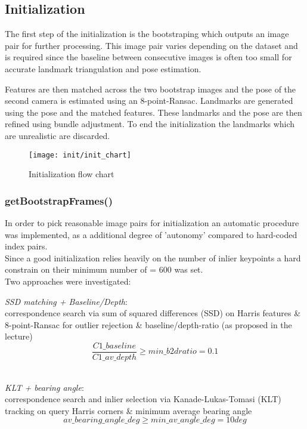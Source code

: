 \subsection{Initialization}
\label{sec_init}
The first step of the initialization is the bootstraping which outputs an image pair for further processing. This image pair varies depending on the dataset and is required since the baseline between consecutive images is often too small for accurate landmark triangulation and pose estimation.

Features are then matched across the two bootstrap images and the pose of the second camera is estimated using an 8-point-Ransac.
Landmarks are generated using the pose and the matched features. These landmarks and the pose are then refined using bundle adjustment. To end the initialization the landmarks which are unrealistic are discarded.

\begin{figure}[ht]
	\centering
	\texttt{[image: init/init\_chart]}
	\caption{Initialization flow chart}
	\label{img_flow_init}
\end{figure}

\subsubsection{getBootstrapFrames()}
\label{sec_boot}
In order to pick reasonable image pairs for initialization an automatic procedure was implemented, as a additional degree of 'autonomy' compared to hard-coded index pairs.\\
Since a good initialization relies heavily on the number of inlier keypoints a hard constrain on their minimum number of  = $600$ was set.\\

Two approaches were investigated:
\begin{compactitem}
	\item \textit{SSD matching + Baseline/Depth}:\\
	correspondence search via sum of squared differences (SSD) on Harris features \& 8-point-Ransac for outlier rejection \& baseline/depth-ratio (as proposed in the lecture)\\
	\begin{equation}
		\frac{C1\_baseline}{C1\_av\_depth} \geqslant min\_b2dratio = 0.1
	\end{equation}\\
	
	\item \textit{KLT + bearing angle}:\\
	correspondence search and inlier selection via Kanade-Lukas-Tomasi (KLT) tracking on query Harris corners \& minimum average bearing angle\\
	\begin{equation}
		av\_bearing\_angle\_deg \geqslant min\_av\_angle\_deg = 10 deg
	\end{equation}
\end{compactitem}

